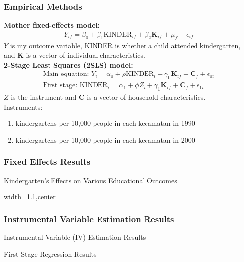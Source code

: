 \documentclass{beamer}
\newcommand\Fontvi{\fontsize{9}{10}\selectfont}
\begin{document}
\begin{frame}
\frametitle{Empirical Methods}
\Fontvi
\vspace{0.1in}
\textbf{Mother fixed-effects model:}
\begin{gather}
Y_{if} = \beta_0 + \beta_1\text{KINDER}_{if} + \beta_2 \mathbf{K}_{if} + \mu_f + \epsilon_{if}
\end{gather}
$Y$ is my outcome variable, KINDER is whether a child attended kindergarten, and $\mathbf{K}$ is a vector of individual characteristics.
\vspace{0.1in} \\
\textbf{2-Stage Least Squares (2SLS) model:}
\begin{gather}
\text{Main equation:   } Y_i = \alpha_0 + \rho \text{KINDER}_i + \gamma_0 \mathbf{K}_{if} + \mathbf{C}_{f} + \epsilon_{0i} \\ 
\text{First stage:   } \text{KINDER}_i = \alpha_1 + \phi Z_i + \gamma_1 \mathbf{K}_{if} + \mathbf{C}_{f} + \epsilon_{1i}
\end{gather}
$Z$ is the instrument and $\mathbf{C}$ is a vector of household characteristics. \\
\vspace{0.1in}
Instruments:
\begin{enumerate}
	\item kindergartens per 10,000 people in each kecamatan in 1990
	\item kindergartens per 10,000 people in each kecamatan in 2000
\end{enumerate}
\end{frame}

\begin{frame}
\frametitle{Fixed Effects Results}
\Fontvi
\begin{table}
\caption{Kindergarten's Effects on Various Educational Outcomes}
\begin{adjustbox}{width=1.1\textwidth,center=\textwidth}
	
\end{adjustbox}
\label{tab:fe_results}
\end{table}
\end{frame}

\begin{frame}
\frametitle{Instrumental Variable Estimation Results}
\Fontvi
\begin{table}
\caption{Instrumental Variable (IV) Estimation Results}
\begin{adjustbox}{width=0.8\textwidth,center=\textwidth}
	}
\end{adjustbox}
\end{table}

\begin{table}
\caption{First Stage Regression Results}
\begin{adjustbox}{width=0.8\textwidth,center=\textwidth}
	}
\end{adjustbox}
\end{table}
\end{frame}
\end{document}
